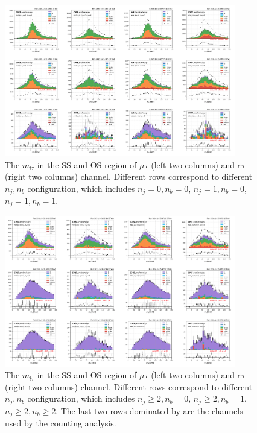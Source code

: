 \begin{figure}
    \centering
    \includegraphics[width=0.9\textwidth]{chapters/Analysis/sectionBackground/figures/ltau_kinematics/ltau1.png}
    \caption{The $m_{l\tau}$ in the SS and OS region of $\mu\tau$ (left two columns) and $e\tau$ (right two columns) 
    channel. Different rows correspond to different $n_j,n_b$ configuration, which includes
    $n_j=0,n_b=0$, $n_j=1,n_b=0$, $n_j=1,n_b=1$. 
    }
    \label{fig:appendix:qcdsf:ltau}
\end{figure}



\begin{figure}
    \centering
    \includegraphics[width=0.9\textwidth]{chapters/Analysis/sectionBackground/figures/ltau_kinematics/ltau2.png}

    \caption{The $m_{l\tau}$ in the SS and OS region of $\mu\tau$ (left two columns) and $e\tau$ (right two columns) 
    channel. Different rows correspond to different $n_j,n_b$ configuration, which includes
    $n_j\geq 2,n_b=0$, $n_j\geq 2,n_b=1$, $n_j\geq 2,n_b\geq 2$. The last two rows dominated by \ttbar are the channels used by the counting analysis.
    }
    \label{fig:appendix:qcdsf:ltau2}
\end{figure}



\FloatBarrier


